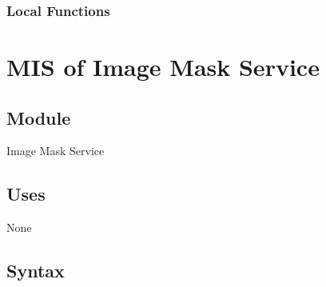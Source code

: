 \documentclass[12pt, titlepage]{article}
\begin{document}
  
  
  
  \subsubsection{Local Functions}

  
   
  

\newpage



\section{MIS of Image Mask Service }\label{image mask service}
  
  
  
  \subsection{Module}
  
  Image Mask Service
  
  \subsection{Uses}
  
  None
  \subsection{Syntax}
\end{document}
